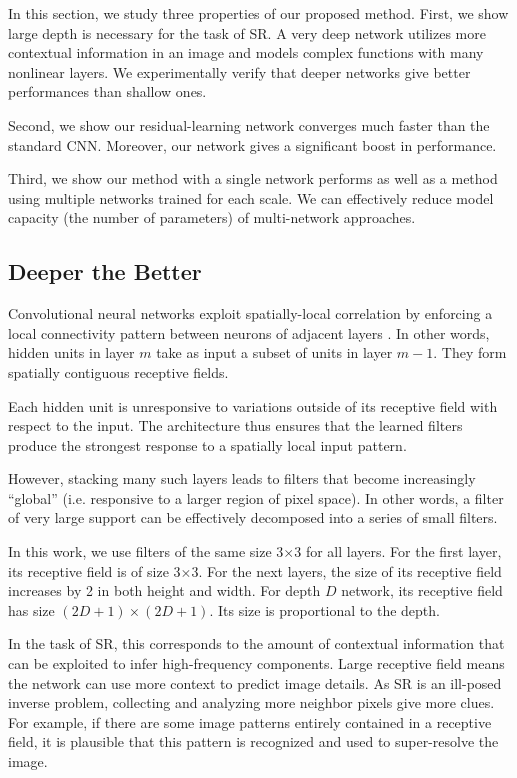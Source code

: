 \documentclass[10pt,twocolumn,letterpaper]{article}
\begin{document}
In this section, we study three properties of our proposed method. First, we show large depth is necessary for the task of SR. A very deep network utilizes more contextual information in an image and models complex functions with many nonlinear layers. We experimentally verify that deeper networks give better performances than shallow ones. 

Second, we show our residual-learning network converges much faster than the standard CNN. Moreover, our network gives a significant boost in performance. 

Third, we show our method with a single network performs as well as a method using multiple networks trained for each scale. We can effectively reduce model capacity (the number of parameters) of multi-network approaches.

\subsection{Deeper the Better}
Convolutional neural networks exploit spatially-local correlation by enforcing a local connectivity pattern between neurons of adjacent layers \cite{Bengio-et-al-2015-Book}. In other words, hidden units in layer $m$ take as input a subset of units in layer $m-1$. They form spatially contiguous receptive fields.

Each hidden unit is unresponsive to variations outside of its receptive field with respect to the input. The architecture thus ensures that the learned filters produce the strongest response to a spatially local input pattern.

However, stacking many such layers leads to filters that become increasingly “global” (i.e. responsive to a larger region of pixel space). In other words, a filter of very large support can be effectively decomposed into a series of small filters. 

In this work, we use filters of the same size 3$\times$3 for all layers. For the first layer, its receptive field is of size 3$\times$3. For the next layers, the size of its receptive field increases by 2 in both height and width. For depth $D$ network, its receptive field has size $(2D+1)\times(2D+1)$. Its size is proportional to the depth.

In the task of SR, this corresponds to the amount of contextual information that can be exploited to infer high-frequency components. Large receptive field means the network can use more context to predict image details. As SR is an ill-posed inverse problem, collecting and analyzing more neighbor pixels give more clues. For example, if there are some image patterns entirely contained in a receptive field, it is plausible that this pattern is recognized and used to super-resolve the image. 
\end{document}
